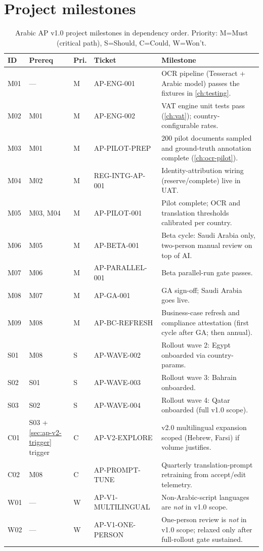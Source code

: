 \section{Project milestones}\label{sec:ap-milestones}

\begin{table}[htbp]
\centering
\caption{Arabic AP v1.0 project milestones in dependency order.
Priority: M=Must (critical path), S=Should, C=Could, W=Won't.}
\label{tab:ap-milestones}
\footnotesize
\begin{tabularx}{\linewidth}{@{}l l l l X@{}}
\toprule
\textbf{ID} & \textbf{Prereq} & \textbf{Pri.} & \textbf{Ticket} & \textbf{Milestone} \\ \midrule
M01 & ---       & M & AP-ENG-001         & OCR pipeline (Tesseract + Arabic model) passes the fixtures in \cref{ch:testing}. \\
M02 & M01       & M & AP-ENG-002         & VAT engine unit tests pass (\cref{ch:vat}); country-configurable rates.\\
M03 & M01       & M & AP-PILOT-PREP      & 200 pilot documents sampled and ground-truth annotation complete (\cref{ch:ocr-pilot}). \\
M04 & M02       & M & REG-INTG-AP-001    & Identity-attribution wiring (reserve/complete) live in UAT. \\
M05 & M03, M04  & M & AP-PILOT-001       & Pilot complete; OCR and translation thresholds calibrated per country. \\
M06 & M05       & M & AP-BETA-001        & Beta cycle: Saudi Arabia only, two-person manual review on top of AI. \\
M07 & M06       & M & AP-PARALLEL-001    & Beta parallel-run gate passes. \\
M08 & M07       & M & AP-GA-001          & GA sign-off; Saudi Arabia goes live. \\
M09 & M08       & M & AP-BC-REFRESH      & Business-case refresh and compliance attestation (first cycle after GA; then annual). \\
S01 & M08       & S & AP-WAVE-002        & Rollout wave 2: Egypt onboarded via country-params. \\
S02 & S01       & S & AP-WAVE-003        & Rollout wave 3: Bahrain onboarded. \\
S03 & S02       & S & AP-WAVE-004        & Rollout wave 4: Qatar onboarded (full v1.0 scope). \\
C01 & S03 + \cref{sec:ap-v2-trigger} trigger & C & AP-V2-EXPLORE & v2.0 multilingual expansion scoped (Hebrew, Farsi) if volume justifies. \\
C02 & M08       & C & AP-PROMPT-TUNE     & Quarterly translation-prompt retraining from accept/edit telemetry. \\
W01 & ---       & W & AP-V1-MULTILINGUAL & Non-Arabic-script languages are \emph{not} in v1.0 scope. \\
W02 & ---       & W & AP-V1-ONE-PERSON   & One-person review is \emph{not} in v1.0 scope; relaxed only after full-rollout gate sustained. \\
\bottomrule
\end{tabularx}
\end{table}

